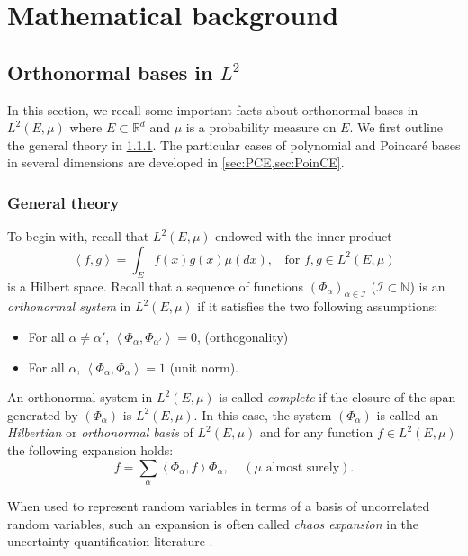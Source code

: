 \documentclass[a4paper,11pt]{article}
\newcommand{\Rr}{{\mathbb R}}
\newcommand{\Nn}{\mathbb{N}}
\newcommand{\innprod}[2]{\left\langle #1, #2 \right\rangle}
\renewcommand{\citep}[2][]{\cite[#1]{#2}}
\theoremstyle{definition}
\theoremstyle{remark}
\theoremstyle{theorem}
\begin{document}
\section{Mathematical background}
\label{sec:theory}

\subsection{Orthonormal bases in $L^2$}
\label{sec:orth_bases}
In this section, we recall some important facts about orthonormal bases in $L^2(E,\mu)$ where $E \subset \Rr^d$ and $\mu$ is a probability measure on $E$. We first outline the general theory in 
\cref{susugege}.
The particular cases of polynomial and Poincar\'e bases in several dimensions are developed in \cref{sec:PCE,sec:PoinCE}. 

\subsubsection{General theory}
\label{susugege}
To begin with, recall that $L^2(E,\mu)$ endowed with the inner pro\-duct
\begin{equation}
\innprod{f}{g}=\int_E f(x)g(x) \mu(dx),\;\; \text{ for } f,g\in L^2(E,\mu)
\label{eq:innprod}
\end{equation}
is a Hilbert space.
Recall that a sequence of functions $(\Phi_\alpha)_{\alpha\in \mathcal{I}}$ ($\mathcal{I} \subset \Nn$) is an \textit{orthonormal system} in $L^2(E,\mu)$ if it satisfies the two following assumptions:
\begin{itemize}
	\item[1)] For all $\alpha\neq\alpha'$, $\innprod{\Phi_\alpha}{\Phi_{\alpha'}}=0$, (orthogonality)
	\item[2)] For all $\alpha$, $\innprod{\Phi_\alpha}{\Phi_\alpha}=1$ (unit norm).
\end{itemize}
%
An orthonormal system in $L^2(E,\mu)$ is called \textit{complete} if the closure of the span generated by $(\Phi_\alpha)$ is $L^2(E,\mu)$.  In this case, the system $(\Phi_\alpha)$ is called an \textit{Hilbertian} or \textit{orthonormal basis} of $L^2(E,\mu)$ and for any function $f\in L^2(E,\mu)$ the following expansion holds:
\begin{equation}
\label{eq:chaos_expansion}
f=\sum_{\alpha}\innprod{\Phi_\alpha}{f}\Phi_\alpha,\;\;\;\; (\mu\mbox{ almost surely}).
\end{equation}


When used to represent random variables in terms of a basis of uncorrelated random variables, such an expansion is often called \textit{chaos expansion} 
in the uncertainty quantification literature
\citep{Wiener1938, Ghanembook1991, Ernst2012}.
\end{document}
